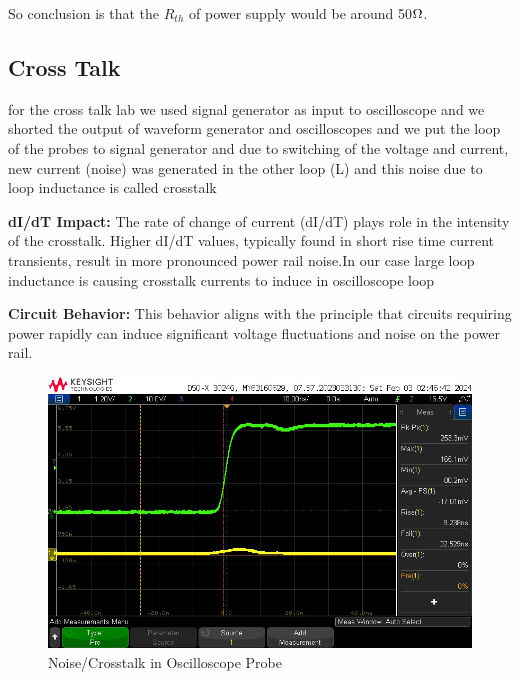 \documentclass[a4paper,11pt]{article}%
\begin{document}
	So conclusion is that the $R_{th}$ of power supply would be around 50$\ohm$.

	\subsection{Cross Talk}


	for the cross talk lab we used signal generator as input to oscilloscope and we shorted the output of waveform generator and oscilloscopes and we put the loop of the probes to signal generator and due to switching of the voltage and current, new current (noise) was generated in the other loop (L) and this noise due to loop inductance is called crosstalk

	\textbf{dI/dT Impact:} The rate of change of current (dI/dT) plays role in the intensity of the crosstalk. Higher dI/dT values, typically found in short rise time current transients, result in more pronounced power rail noise.In our case large loop inductance is causing crosstalk currents to induce in oscilloscope loop

	\textbf{Circuit Behavior:} This behavior aligns with the principle that circuits requiring power rapidly can induce significant voltage fluctuations and noise on the power rail.

	\begin{figure}[!h]
		\centering
		\includegraphics[scale=0.6]{figures/noise_crosstalk.jpeg}
		\caption{Noise/Crosstalk in Oscilloscope Probe}
	\end{figure}
\end{document}
